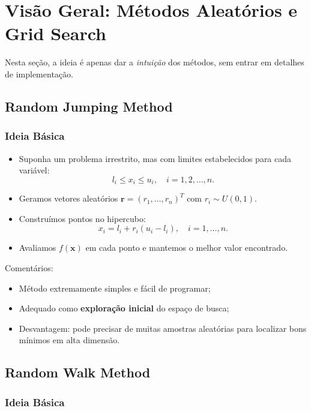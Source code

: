 \documentclass[9pt,a4paper]{extarticle}
\begin{document}
\section{Visão Geral: Métodos Aleatórios e Grid Search}

Nesta seção, a ideia é apenas dar a \emph{intuição} dos métodos, sem entrar em detalhes de implementação.

\subsection{Random Jumping Method}

\subsubsection*{Ideia Básica}

\begin{itemize}
    \item Suponha um problema irrestrito, mas com limites estabelecidos para cada variável:
    \[
        l_i \le x_i \le u_i,\quad i = 1,2,\dots,n.
    \]
    \item Geramos vetores aleatórios $\bm{r} = (r_1,\dots,r_n)^T$ com $r_i \sim U(0,1)$.
    \item Construímos pontos no hipercubo:
    \[
        x_i = l_i + r_i (u_i - l_i), \quad i = 1,\dots,n.
    \]
    \item Avaliamos $f(\bm{x})$ em cada ponto e mantemos o melhor valor encontrado.
\end{itemize}

Comentários:
\begin{itemize}
    \item Método extremamente simples e fácil de programar;
    \item Adequado como \textbf{exploração inicial} do espaço de busca;
    \item Desvantagem: pode precisar de muitas amostras aleatórias para localizar bons mínimos em alta dimensão.
\end{itemize}

\subsection{Random Walk Method}

\subsubsection*{Ideia Básica}
\end{document}
